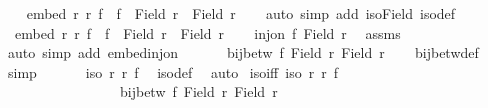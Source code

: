 \begin{isabellebody}
\ \ \isamarkupfalse%
\ {\isachardoublequoteopen}embed\ r\ r{\isacharprime}{\kern0pt}\ f\ {\isasymand}\ f\ {\isacharbackquote}{\kern0pt}\ {\isacharparenleft}{\kern0pt}Field\ r{\isacharparenright}{\kern0pt}\ {\isacharequal}{\kern0pt}\ Field\ r{\isacharprime}{\kern0pt}{\isachardoublequoteclose}\isanewline
\ \ \isamarkupfalse%
\ {\isacharparenleft}{\kern0pt}auto\ simp\ add{\isacharcolon}{\kern0pt}\ iso{\isacharunderscore}{\kern0pt}Field\ iso{\isacharunderscore}{\kern0pt}def{\isacharparenright}{\kern0pt}\isanewline
{}\isamarkupfalse%
\isanewline
\ \ \isamarkupfalse%
\ {\isacharasterisk}{\kern0pt}{\isacharcolon}{\kern0pt}\ {\isachardoublequoteopen}embed\ r\ r{\isacharprime}{\kern0pt}\ f\ {\isasymand}\ f\ {\isacharbackquote}{\kern0pt}\ Field\ r\ {\isacharequal}{\kern0pt}\ Field\ r{\isacharprime}{\kern0pt}{\isachardoublequoteclose}\isanewline
\ \ \isamarkupfalse%
\ {\isachardoublequoteopen}inj{\isacharunderscore}{\kern0pt}on\ f\ {\isacharparenleft}{\kern0pt}Field\ r{\isacharparenright}{\kern0pt}{\isachardoublequoteclose}\ \isamarkupfalse%
\ assms\ \isamarkupfalse%
\ {\isacharparenleft}{\kern0pt}auto\ simp\ add{\isacharcolon}{\kern0pt}\ embed{\isacharunderscore}{\kern0pt}inj{\isacharunderscore}{\kern0pt}on{\isacharparenright}{\kern0pt}\isanewline
\ \ \isamarkupfalse%
\ {\isacharasterisk}{\kern0pt}\ \isamarkupfalse%
\ {\isachardoublequoteopen}bij{\isacharunderscore}{\kern0pt}betw\ f\ {\isacharparenleft}{\kern0pt}Field\ r{\isacharparenright}{\kern0pt}\ {\isacharparenleft}{\kern0pt}Field\ r{\isacharprime}{\kern0pt}{\isacharparenright}{\kern0pt}{\isachardoublequoteclose}\isanewline
\ \ \isamarkupfalse%
\ bij{\isacharunderscore}{\kern0pt}betw{\isacharunderscore}{\kern0pt}def\ \isamarkupfalse%
\ simp\isanewline
\ \ \isamarkupfalse%
\ {\isacharasterisk}{\kern0pt}\ \isamarkupfalse%
\ {\isachardoublequoteopen}iso\ r\ r{\isacharprime}{\kern0pt}\ f{\isachardoublequoteclose}\ \isamarkupfalse%
\ iso{\isacharunderscore}{\kern0pt}def\ \isamarkupfalse%
\ auto\isanewline
{}\isamarkupfalse%
%
\endisatagproof
{\isafoldproof}%
%
\isadelimproof
\isanewline
%
\endisadelimproof
\isanewline
{}\isamarkupfalse%
\ iso{\isacharunderscore}{\kern0pt}iff{}{\isacharcolon}{\kern0pt}\ {\isachardoublequoteopen}iso\ r\ r{\isacharprime}{\kern0pt}\ f\ {\isasymlongleftrightarrow}\isanewline
\ \ \ \ \ \ \ \ \ \ \ \ \ \ \ \ \ bij{\isacharunderscore}{\kern0pt}betw\ f\ {\isacharparenleft}{\kern0pt}Field\ r{\isacharparenright}{\kern0pt}\ {\isacharparenleft}{\kern0pt}Field\ r{\isacharprime}{\kern0pt}{\isacharparenright}{\kern0pt}\ {\isasymand}\ \isanewline

\end{isabellebody}
